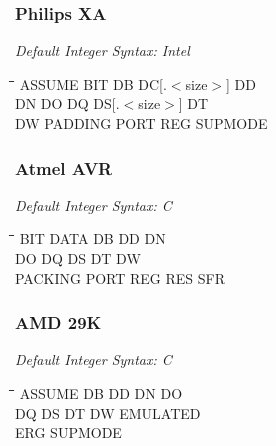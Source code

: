 \subsubsection{Philips XA}

{\em Default Integer Syntax: Intel}

{\tt\begin{tabbing}
\hspace{3cm}\=\hspace{3cm}\=\hspace{3cm}\=\hspace{3cm}\=\kill
ASSUME     \> BIT         \> DB          \> DC[.$<$size$>$] \> DD \\
DN         \> DO          \> DQ          \> DS[.$<$size$>$] \> DT \\
DW         \> PADDING     \> PORT        \> REG             \> SUPMODE \\
\end{tabbing}}

\subsubsection{Atmel AVR}

{\em Default Integer Syntax: C}

{\tt\begin{tabbing}
\hspace{3cm}\=\hspace{3cm}\=\hspace{3cm}\=\hspace{3cm}\=\kill
BIT        \> DATA       \> DB          \> DD           \> DN \\
DO         \> DQ         \> DS          \> DT           \> DW \\
PACKING    \> PORT       \> REG         \> RES          \> SFR \\
\end{tabbing}}

\subsubsection{AMD 29K}

{\em Default Integer Syntax: C}

{\tt\begin{tabbing}
\hspace{3cm}\=\hspace{3cm}\=\hspace{3cm}\=\hspace{3cm}\=\kill
ASSUME     \> DB          \> DD          \> DN          \> DO \\
DQ         \> DS          \> DT          \> DW          \> EMULATED \\
ERG        \> SUPMODE \\
\end{tabbing}}

